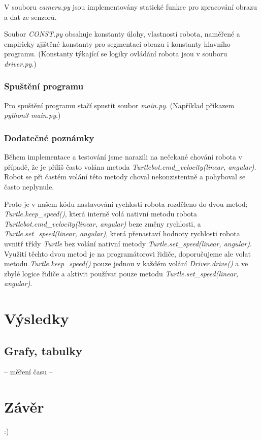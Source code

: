 \documentclass{article}
\begin{document}
	V souboru \emph{camera.py} jsou implementovány statické funkce pro zpracování obrazu a dat ze senzorů.
	
	Soubor \emph{CONST.py} obsahuje konstanty úlohy, vlastností robota, naměřené a empiricky zjištěné konstanty pro segmentaci obrazu i konstanty hlavního programu. (Konstanty týkající se logiky ovládání robota jsou v souboru \emph{driver.py}.)
	
\subsubsection{Spuštění programu}

	Pro spuštění programu stačí spustit soubor \emph{main.py}. (Například přikazem \emph{python3 main.py}.)

\subsubsection{Dodatečné poznámky}

	Během implementace a testování jsme narazili na nečekané chování robota v případě, že je příliš často volána metoda \emph{Turtlebot.cmd\_velocity(linear, angular)}. Robot se při častém volání této metody choval nekonzistentně a pohyboval se často neplynule.

	Proto je v našem kódu nastavování rychlosti robota rozděleno do dvou metod; \emph{Turtle.keep\_speed()}, která interně volá nativní metodu robota \emph{Turtlebot.cmd\_velocity(linear, angular)} beze změny rychlosti, a \emph{Turtle.set\_speed(linear, angular)}, která přenastaví hodnoty rychlosti robota uvnitř třídy \emph{Turtle} bez volání nativní metody \emph{Turtle.set\_speed(linear, angular)}. Využití těchto dvou metod je na programátorovi řidiče, doporučujeme ale volat metodu \emph{Turtle.keep\_speed()} pouze jednou v každém volání \emph{Driver.drive()} a ve zbylé logice řidiče a aktivit používat pouze metodu \emph{Turtle.set\_speed(linear, angular)}.

\section{Výsledky}
	
	
\subsection{Grafy, tabulky}
	-- měření času --

\newpage
\section{Závěr}
 	:)
\end{document}
